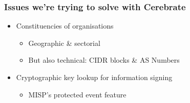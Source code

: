 \begin{frame}
\frametitle{Issues we're trying to solve with Cerebrate}
    \begin{minipage}{0.8\textwidth}
        \begin{itemize}
            \item Constituencies of organisations
            \begin{itemize}
                \item Geographic \& sectorial
                \item But also technical: CIDR blocks \& AS Numbers
            \end{itemize}
            \item Cryptographic key lookup for information signing
            \begin{itemize}
                \item MISP's protected event feature
            \end{itemize}
        \end{itemize}
    \end{minipage}
    \begin{minipage}{0.19\textwidth}
    \end{minipage}
\end{frame}

